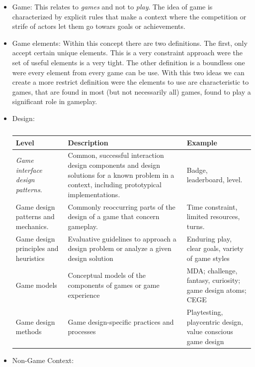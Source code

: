 \begin{itemize}

\item Game: This relates to \emph{games} and not to \emph{play}. The idea of game is
characterized by explicit rules that make a context where the competition or strife
of actors let them go towars goals or achievements.    

\item Game elements: Within this concept there are two definitions. The first,
only accept certain unique elements. This is a very constraint approach were the set
of useful elements is a very tight. The other definition is a boundless one were every
element from every game can be use. With this two ideas we can create a more restrict 
definition were the elements to use are characteristic to games, that are
found in most (but not necessarily all) games, found to play a significant role in gameplay. 

\item Design: 

\begin{table}[h]
  \begin{center}
    \begin{tabular}{ | p{5cm} | p{5cm} | p{5cm} |}
    \hline
    Level & Description &  Example \\ \hline
    \emph{Game interface design patterns}. & 
    Common, successful interaction
    design components and design
    solutions for a known problem in
    a context, including prototypical
    implementations. &
    Badge, leaderboard, level. \\ \hline
    Game design patterns and
    mechanics. & 
    Commonly reoccurring parts of
    the design of a game that concern
    gameplay. &
    Time constraint,
    limited resources,
    turns. \\ \hline
    Game design principles and
    heuristics &
    Evaluative guidelines to approach
    a design problem or
    analyze a given design solution &
    Enduring play, clear goals, variety of
    game styles \\ \hline
    Game models &
    Conceptual models of the
    components of games or game
    experience &
    MDA; challenge,
    fantasy, curiosity;
    game design atoms;
    CEGE \\ \hline
    Game design methods &
    Game design-specific practices
    and processes &
    Playtesting, playcentric design,
    value conscious game design \\ \hline
    \end{tabular}
    \caption[]{\cite{DefineGamefication}}
  \end{center}
\end{table}
\item Non-Game Context:

\end{itemize}


